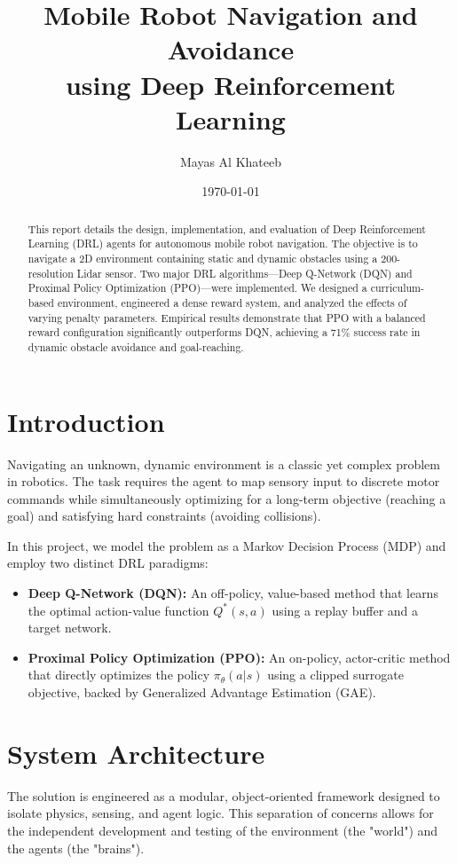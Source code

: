 \documentclass{article}
\title{Mobile Robot Navigation and Avoidance \\ using Deep Reinforcement Learning}
\author{Mayas Al Khateeb}
\date{\today}
\begin{document}
\maketitle

\begin{abstract}
This report details the design, implementation, and evaluation of Deep Reinforcement Learning (DRL) agents for autonomous mobile robot navigation. The objective is to navigate a 2D environment containing static and dynamic obstacles using a 200-resolution Lidar sensor. Two major DRL algorithms—Deep Q-Network (DQN) and Proximal Policy Optimization (PPO)—were implemented. We designed a curriculum-based environment, engineered a dense reward system, and analyzed the effects of varying penalty parameters. Empirical results demonstrate that PPO with a balanced reward configuration significantly outperforms DQN, achieving a 71\% success rate in dynamic obstacle avoidance and goal-reaching.
\end{abstract}

\section{Introduction}
Navigating an unknown, dynamic environment is a classic yet complex problem in robotics. The task requires the agent to map sensory input to discrete motor commands while simultaneously optimizing for a long-term objective (reaching a goal) and satisfying hard constraints (avoiding collisions). 

In this project, we model the problem as a Markov Decision Process (MDP) and employ two distinct DRL paradigms:
\begin{itemize}
    \item \textbf{Deep Q-Network (DQN):} An off-policy, value-based method that learns the optimal action-value function $Q^*(s,a)$ using a replay buffer and a target network.
    \item \textbf{Proximal Policy Optimization (PPO):} An on-policy, actor-critic method that directly optimizes the policy $\pi_\theta(a|s)$ using a clipped surrogate objective, backed by Generalized Advantage Estimation (GAE).
\end{itemize}

\section{System Architecture}

The solution is engineered as a modular, object-oriented framework designed to isolate physics, sensing, and agent logic. This separation of concerns allows for the independent development and testing of the environment (the "world") and the agents (the "brains"). 
\end{document}
